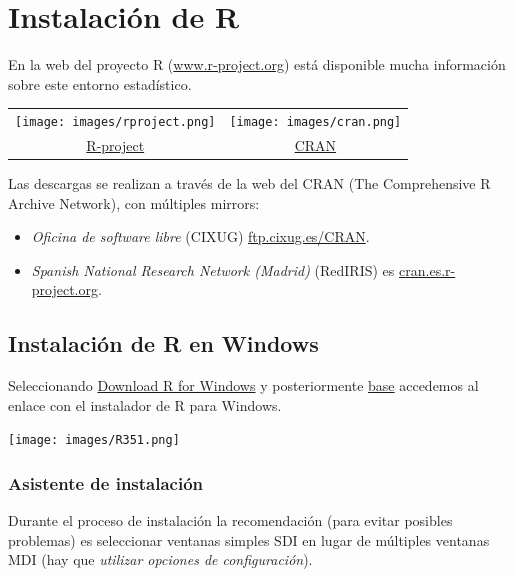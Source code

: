 \documentclass[
]{book}
\providecommand{\tightlist}{%
  \setlength{\itemsep}{0pt}\setlength{\parskip}{0pt}}
\begin{document}
\chapter{Instalación de R}\label{instalaciuxf3n-de-r}

En la web del proyecto R
(\href{http://www.r-project.org}{www.r-project.org}) está disponible
mucha información sobre este entorno estadístico.

\begin{longtable}[]{@{}cc@{}}
\toprule\noalign{}
\endhead
\bottomrule\noalign{}
\endlastfoot
\texttt{[image: images/rproject.png]} & \texttt{[image: images/cran.png]} \\
\href{https://r-project.org}{R-project} & \href{https://cran.r-project.org}{CRAN} \\
\end{longtable}

Las descargas se realizan a través de la web del CRAN (The Comprehensive
R Archive Network), con múltiples mirrors:

\begin{itemize}
\tightlist
\item
  \emph{Oficina de software libre} (CIXUG) \href{http://ftp.cixug.es/CRAN/}{ftp.cixug.es/CRAN}.
\item
  \emph{Spanish National Research Network (Madrid)} (RedIRIS) es
  \href{http://cran.es.r-project.org/}{cran.es.r-project.org}.
\end{itemize}

\section{Instalación de R en Windows}\label{instalaciuxf3n-de-r-en-windows}

Seleccionando \href{http://ftp.cixug.es/CRAN/bin/windows/}{Download R for Windows} y posteriormente
\href{http://ftp.cixug.es/CRAN/bin/windows/base/}{base} accedemos
al enlace con el instalador de R para Windows.

\texttt{[image: images/R351.png]}

\subsection{Asistente de instalación}\label{asistente-de-instalaciuxf3n}

Durante el proceso de instalación la recomendación (para evitar posibles problemas) es seleccionar ventanas simples SDI en lugar de múltiples ventanas MDI (hay que \emph{utilizar opciones de configuración}).
\end{document}

